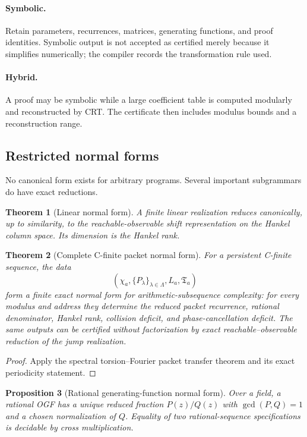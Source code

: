 \documentclass[11pt]{article}
\newtheorem{theorem}{Theorem}[section]\newtheorem{proposition}[theorem]{Proposition}\newtheorem{lemma}[theorem]{Lemma}\newtheorem{corollary}[theorem]{Corollary}
\theoremstyle{definition}\newtheorem{definition}[theorem]{Definition}\newtheorem{example}[theorem]{Example}\newtheorem{construction}[theorem]{Construction}\newtheorem{algorithm}[theorem]{Algorithm}\newtheorem{conjecture}[theorem]{Conjecture}\newtheorem{problem}[theorem]{Problem}
\theoremstyle{remark}\newtheorem{remark}[theorem]{Remark}\newtheorem{boundary}[theorem]{Boundary}\newtheorem{certificate}[theorem]{Computational Certificate}\newtheorem{classical}[theorem]{Classical Input}\newtheorem{principle}[theorem]{Structural Principle}
\begin{document}
\paragraph{Symbolic.}
Retain parameters, recurrences, matrices, generating functions, and proof identities.  Symbolic output is not accepted as certified merely because it simplifies numerically; the compiler records the transformation rule used.

\paragraph{Hybrid.}
A proof may be symbolic while a large coefficient table is computed modularly and reconstructed by CRT.  The certificate then includes modulus bounds and a reconstruction range.

\subsection{Restricted normal forms}
No canonical form exists for arbitrary programs.  Several important subgrammars do have exact reductions.

\begin{theorem}[Linear normal form]
A finite linear realization reduces canonically, up to similarity, to the reachable-observable shift representation on the Hankel column space.  Its dimension is the Hankel rank.
\end{theorem}

\begin{theorem}[Complete C-finite packet normal form]
For a persistent C-finite sequence, the data
\[
 (\chi_a,\{P_\lambda\}_{\lambda\in\Lambda},L_a,\mathfrak T_a)
\]
form a finite exact normal form for arithmetic-subsequence complexity: for every modulus and address they determine the reduced packet recurrence, rational denominator, Hankel rank, collision deficit, and phase-cancellation deficit.  The same outputs can be certified without factorization by exact reachable--observable reduction of the jump realization.
\end{theorem}
\begin{proof}
Apply the spectral torsion--Fourier packet transfer theorem and its exact periodicity statement.
\end{proof}

\begin{proposition}[Rational generating-function normal form]
Over a field, a rational OGF has a unique reduced fraction $P(z)/Q(z)$ with $\gcd(P,Q)=1$ and a chosen normalization of $Q$.  Equality of two rational-sequence specifications is decidable by cross multiplication.
\end{proposition}
\end{document}
